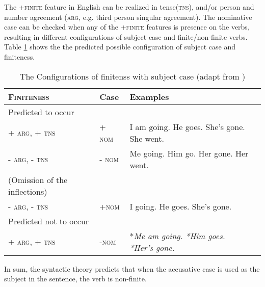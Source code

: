 The \textsc{+finite} feature in English can be realized in tense(\textsc{tns}), and/or person and number agreement (\textsc{arg}, e.g. third person singular agreement). The nominative case can be checked when any of the \textsc{+finite} features is presence on the verbs, resulting in different configurations of subject case and finite/non-finite verbs. Table \ref{tab: pattern} shows the the predicted possible configuration of subject case and finiteness. 

\FloatBarrier
\begin{table}[!h]
    \centering
    \caption{The Configurations of finitenss with subject case (adapt from \cite{pine2005testing})}
    \begin{tabular}{llll}
    \toprule
        \textsc{Finiteness} & Case  & Examples  \\
    \hline
    Predicted to occur & & \\
         \textsc{+ arg, + tns} & \textsc{+ nom} & I am going. He goes. She's gone. She went.\\
         \textsc{- arg, - tns} & \textsc{- nom} & Me going. Him go. Her gone. Her went. \\
         (Omission of the inflections)\\
         \textsc{- arg, - tns} & \textsc{+nom} & I going. He goes. She's gone. \\
       \hline
       Predicted not to occur & & \\
       \textsc{+ arg, + tns} &  \textsc{-nom} & *\textit{Me am going. *Him goes. *Her's gone.} \\
        \bottomrule
    \end{tabular}
    \label{tab: pattern}
\end{table}
\FloatBarrier
In sum, the syntactic theory predicts that when the accusative case is used as the subject in the sentence, the verb is non-finite. 

